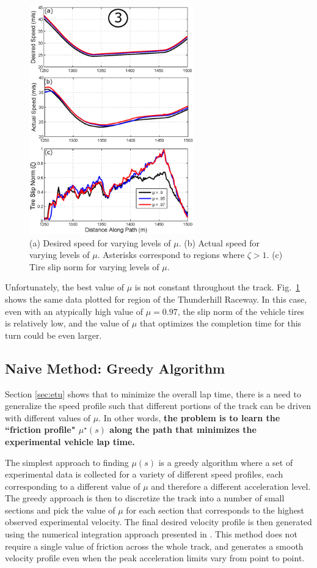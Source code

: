 \documentclass[9pt,shortpaper,twoside,web]{ieeecolor}
\newcommand*\circled[1]{\tikz[baseline=(char.base)]{
            \node[shape=circle,draw,inner sep=2pt] (char) {#1};}}
\begin{document}
{{{ \begin{figure}[tb]
\centering
\includegraphics[width=2.8in]{figures/t3res.eps}
\caption[Desired speed for varying levels of $\mu$ - region 3]{(a) Desired speed for varying levels of $\mu$. (b) Actual speed for varying levels of $\mu$. Asterisks correspond to 
regions where $\zeta > 1$. (c) Tire slip norm for varying levels of $\mu$. }
\label{fig:t3}
\end{figure}

Unfortunately, the best value of $\mu$ is not constant throughout the track. Fig.~\ref{fig:t3} shows the same data plotted for region \circled{3} of the 
Thunderhill Raceway. In this case, even with an atypically high value of 
$\mu = 0.97$, the slip norm of the vehicle tires is relatively low, and the value of $\mu$ that optimizes the completion time for this turn could 
be even larger. 

\subsection{Naive Method: Greedy Algorithm}
\label{sec:greedy}

Section \ref{sec:etu} shows that to  minimize the overall lap time, there is a need to generalize the speed profile such that different portions of the track can be driven with different
values of $\mu$. In other words, \textbf{the problem is to learn the ``friction profile" $\mu^\star(s)$ along the path that minimizes the experimental vehicle lap time.} 

The simplest approach to finding $\mu(s)$ is a greedy algorithm where a set of experimental data is collected for a variety of different
speed profiles, each corresponding to a different value of $\mu$ and therefore a different acceleration level. The greedy approach is then to discretize
the track into a number of small sections and pick the value of $\mu$ for each section that corresponds to the highest observed experimental velocity.
The final desired velocity profile is then generated using the numerical integration approach presented in \cite{subosits2015autonomous}. This method does not require a single 
value of friction across the whole track, and generates a smooth velocity profile even when the peak acceleration limits vary from point to point. 

}}}
\end{document}
